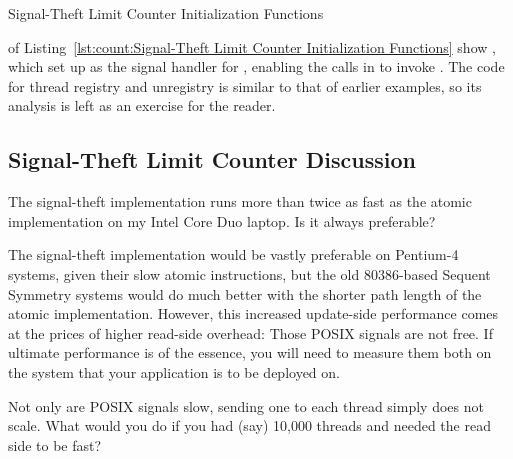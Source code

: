 \begin{listing}[tbp]

\caption{Signal-Theft Limit Counter Initialization Functions}
\label{lst:count:Signal-Theft Limit Counter Initialization Functions}
\end{listing}

\begin{lineref}
 of
Listing~\ref{lst:count:Signal-Theft Limit Counter Initialization Functions}
show , which set up 
as the signal handler for ,
enabling the  calls in 
to invoke .
The code for thread registry and unregistry is similar to that of
earlier examples, so its analysis is left as an exercise for the
reader.
\end{lineref}

\subsection{Signal-Theft Limit Counter Discussion}

The signal-theft implementation runs more than twice as fast as the
atomic implementation on my Intel Core Duo laptop.
Is it always preferable?

The signal-theft implementation would be vastly preferable on Pentium-4
systems, given their slow atomic instructions, but the old 80386-based
Sequent Symmetry systems would do much better with the shorter path
length of the atomic implementation.
However, this increased update-side performance comes at the
prices of higher read-side overhead: Those POSIX signals are not free.
If ultimate performance is of the essence, you will need to measure
them both on the system that your application is to be deployed on.

\QuickQuiz{}
	Not only are POSIX signals slow, sending one to each thread
	simply does not scale.
	What would you do if you had (say) 10,000 threads and needed
	the read side to be fast?
 \QuickQuizEnd

